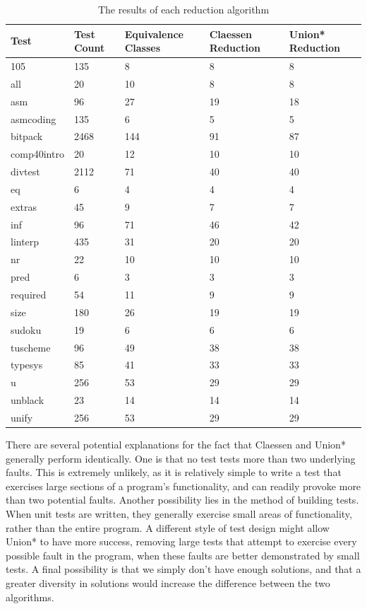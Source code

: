 \documentclass[11pt,twoside]{article}
\begin{document}
\begin{table}[t]
\centering
\begin{tabular}{ | l | l | l | l | l | }
\hline
Test & Test Count & Equivalence Classes &  Claessen Reduction &  Union* Reduction \\ 
\hline
105 & 135 & 8 & 8 & 8 \\
all & 20 & 10 & 8 & 8 \\
asm & 96 & 27 & 19 & 18 \\
asmcoding & 135 & 6 & 5 & 5 \\
bitpack & 2468 & 144 & 91 & 87 \\
comp40intro & 20 & 12 & 10 & 10 \\
divtest & 2112 & 71 & 40 & 40 \\
eq & 6 & 4 & 4 & 4 \\
extras & 45 & 9 & 7 & 7 \\
inf & 96 & 71 & 46 & 42 \\
linterp & 435 & 31 & 20 & 20 \\
nr & 22 & 10 & 10 & 10 \\
pred & 6 & 3 & 3 & 3 \\
required & 54 & 11 & 9 & 9 \\
size & 180 & 26 & 19 & 19 \\
sudoku & 19 & 6 & 6 & 6 \\
tuscheme & 96 & 49 & 38 & 38 \\
typesys & 85 & 41 & 33 & 33 \\
u & 256 & 53 & 29 & 29 \\
unblack & 23 & 14 & 14 & 14 \\
unify & 256 & 53 & 29 & 29 \\
\hline
\end{tabular}
\caption{The results of each reduction algorithm}
\end{table}

There are several potential explanations for the fact that Claessen and Union* generally perform identically. One is that no test tests more than two underlying faults. This is extremely unlikely, as it is relatively simple to write a test that exercises large sections of a program's functionality, and can readily provoke more than two potential faults. Another possibility lies in the method of building tests. When unit tests are written, they generally exercise small areas of functionality, rather than the entire program. A different style of test design might allow Union* to have more success, removing large tests that attempt to exercise every possible fault in the program, when these faults are better demonstrated by small tests. A final possibility is that we simply don't have enough solutions, and that a greater diversity in solutions would increase the difference between the two algorithms.
\end{document}
